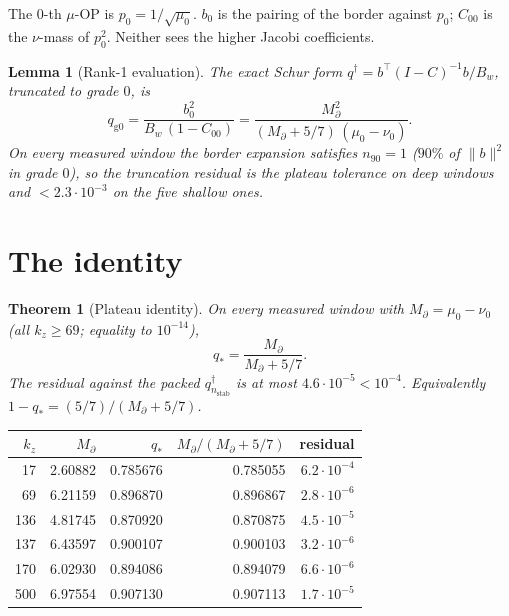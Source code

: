 \documentclass[11pt]{article}
\newtheorem{lemma}{Lemma}
\newtheorem{thm}{Theorem}
\begin{document}
The $0$-th $\mu$-OP is $p_0=1/\sqrt{\mu_0}$.
$b_0$ is the pairing of the border against
$p_0$; $C_{00}$ is the $\nu$-mass of
$p_0^2$.
Neither sees the higher Jacobi coefficients.

\begin{lemma}[Rank-1 evaluation]\label{lem:rank1}
The exact Schur form
$q^{\dagger}=b^\top(I-C)^{-1}b/B_w$,
truncated to grade $0$, is
\[
q_{\mathrm{g0}}
=\frac{b_0^2}{B_w\,(1-C_{00})}
=\frac{M_\partial^2}{(M_\partial+5/7)\,(\mu_0-\nu_0)}.
\]
On every measured window the border
expansion satisfies $n_{90}=1$
($90\%$ of $\|b\|^2$ in grade $0$), so
the truncation residual is the plateau
tolerance on deep windows and
$<2.3\cdot10^{-3}$ on the five shallow
ones.
\end{lemma}

\section{The identity}\label{sec:satz}

\begin{thm}[Plateau identity]\label{thm:qstar}
On every measured window with
$M_\partial=\mu_0-\nu_0$
(all $k_z\ge 69$; equality to
$10^{-14}$),
\[
q_*
=\frac{M_\partial}{M_\partial+5/7}.
\]
The residual against the packed
$q^{\dagger}_{n_{\mathrm{stab}}}$ is at
most $4.6\cdot10^{-5}<10^{-4}$.
Equivalently
$1-q_*=(5/7)/(M_\partial+5/7)$.
\end{thm}

\begin{center}
\small
\begin{tabular}{rrrrr}
\toprule
$k_z$ & $M_\partial$ & $q_*$ & $M_\partial/(M_\partial+5/7)$ & residual \\
\midrule
17 & 2.60882 & 0.785676 & 0.785055 & $6.2\cdot10^{-4}$ \\
69 & 6.21159 & 0.896870 & 0.896867 & $2.8\cdot10^{-6}$ \\
136 & 4.81745 & 0.870920 & 0.870875 & $4.5\cdot10^{-5}$ \\
137 & 6.43597 & 0.900107 & 0.900103 & $3.2\cdot10^{-6}$ \\
170 & 6.02930 & 0.894086 & 0.894079 & $6.6\cdot10^{-6}$ \\
500 & 6.97554 & 0.907130 & 0.907113 & $1.7\cdot10^{-5}$ \\
\bottomrule
\end{tabular}
\end{center}
\end{document}
